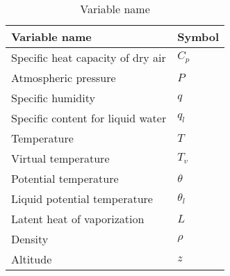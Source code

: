 {{\begin{table}[htbp]
\begin{center}
\begin{tabular}{|l|p{113pt}|}
\hline
\textbf{Variable name} &\textbf{Symbol} \\
\hline
Specific heat capacity of dry air & $C_{p}$ \\
\hline
Atmospheric pressure & $P$ \\
\hline
Specific humidity & $q$ \\
\hline
Specific content for liquid water & $q_{l}$ \\
\hline
Temperature & $T$ \\
\hline
Virtual temperature & $T_{v}$ \\
\hline
Potential temperature & $\theta$ \\
\hline
Liquid potential temperature & $\theta_{l}$ \\
\hline
Latent heat of vaporization & $L$ \\
\hline
Density & $\rho $ \\
\hline
Altitude & $z$ \\
\hline
\end{tabular}\label{tab3}
\caption{Variable name}
\end{center}
\end{table}
%
}}
